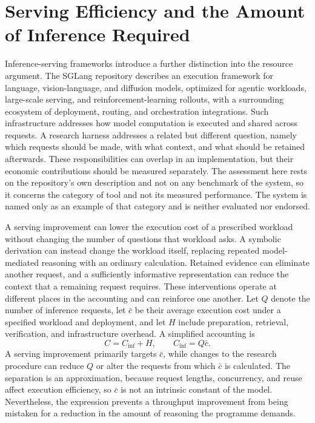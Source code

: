 \documentclass[11pt]{article}
\theoremstyle{remark}
\begin{document}
\section{Serving Efficiency and the Amount of Inference Required}\label{sec:serving}

Inference-serving frameworks introduce a further distinction into the resource argument. The SGLang repository \cite{sglang} describes an execution framework for language, vision-language, and diffusion models, optimized for agentic workloads, large-scale serving, and reinforcement-learning rollouts, with a surrounding ecosystem of deployment, routing, and orchestration integrations. Such infrastructure addresses how model computation is executed and shared across requests. A research harness addresses a related but different question, namely which requests should be made, with what context, and what should be retained afterwards. These responsibilities can overlap in an implementation, but their economic contributions should be measured separately. The assessment here rests on the repository's own description and not on any benchmark of the system, so it concerns the category of tool and not its measured performance. The system is named only as an example of that category and is neither evaluated nor endorsed.

A serving improvement can lower the execution cost of a prescribed workload without changing the number of questions that workload asks. A symbolic derivation can instead change the workload itself, replacing repeated model-mediated reasoning with an ordinary calculation. Retained evidence can eliminate another request, and a sufficiently informative representation can reduce the context that a remaining request requires. These interventions operate at different places in the accounting and can reinforce one another. Let $Q$ denote the number of inference requests, let $\bar c$ be their average execution cost under a specified workload and deployment, and let $H$ include preparation, retrieval, verification, and infrastructure overhead. A simplified accounting is
\begin{equation}
C = C_{\mathrm{inf}} + H, \qquad C_{\mathrm{inf}} = Q\bar c .
\end{equation}
A serving improvement primarily targets $\bar c$, while changes to the research procedure can reduce $Q$ or alter the requests from which $\bar c$ is calculated. The separation is an approximation, because request lengths, concurrency, and reuse affect execution efficiency, so $\bar c$ is not an intrinsic constant of the model. Nevertheless, the expression prevents a throughput improvement from being mistaken for a reduction in the amount of reasoning the programme demands.
\end{document}
